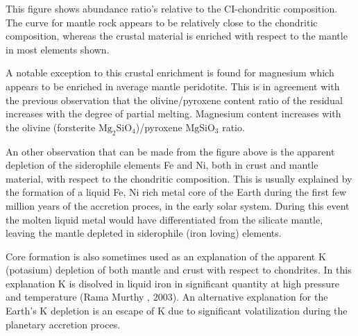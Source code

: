 This figure shows abundance ratio's relative to the CI-chondritic composition.
The curve for mantle rock appears to be relatively close to the chondritic composition,
whereas the crustal material is enriched with respect to the mantle in
most elements shown.

A notable exception to this crustal enrichment is found for magnesium which appears
to be enriched in average mantle peridotite.
This is in agreement with the previous observation that 
the olivine/pyroxene content ratio of the residual increases with the
degree of partial melting.
Magnesium content increases with the olivine 
(forsterite $\mathrm{Mg_2SiO_4}$)/pyroxene $\mathrm{MgSiO_3}$ ratio.

An other observation that can be made from the figure above 
is the apparent depletion of the siderophile elements Fe and Ni, both in
crust and mantle material, with respect to the chondritic composition.
This is usually explained by the formation of a liquid Fe, Ni rich metal core
of the Earth during the first few million years of the accretion proces,
in the early solar system.
During this event the molten liquid metal would have differentiated from the 
silicate mantle, leaving the mantle depleted in siderophile (iron loving) elements.

Core formation is also sometimes used as an explanation of the apparent K
(potasium) depletion of both mantle and crust with respect to chondrites.
In this explanation K is disolved in liquid iron in significant quantity
at high pressure and temperature (Rama Murthy \etal, 2003).
An alternative explanation for the Earth's K depletion is an escape
of K due to significant volatilization during the planetary accretion proces. 

